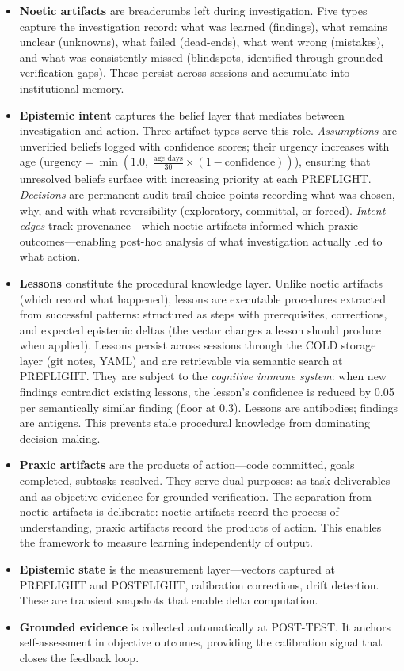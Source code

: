 \begin{itemize}
    \item \textbf{Noetic artifacts} are breadcrumbs left during investigation. Five types capture the investigation record: what was learned (findings), what remains unclear (unknowns), what failed (dead-ends), what went wrong (mistakes), and what was consistently missed (blindspots, identified through grounded verification gaps). These persist across sessions and accumulate into institutional memory.

    \item \textbf{Epistemic intent} captures the belief layer that mediates between investigation and action. Three artifact types serve this role. \emph{Assumptions} are unverified beliefs logged with confidence scores; their urgency increases with age ($\text{urgency} = \min(1.0,\; \frac{\text{age\_days}}{30} \times (1 - \text{confidence}))$), ensuring that unresolved beliefs surface with increasing priority at each PREFLIGHT. \emph{Decisions} are permanent audit-trail choice points recording what was chosen, why, and with what reversibility (exploratory, committal, or forced). \emph{Intent edges} track provenance---which noetic artifacts informed which praxic outcomes---enabling post-hoc analysis of what investigation actually led to what action.

    \item \textbf{Lessons} constitute the procedural knowledge layer. Unlike noetic artifacts (which record what happened), lessons are executable procedures extracted from successful patterns: structured as steps with prerequisites, corrections, and expected epistemic deltas (the vector changes a lesson should produce when applied). Lessons persist across sessions through the COLD storage layer (git notes, YAML) and are retrievable via semantic search at PREFLIGHT. They are subject to the \emph{cognitive immune system}: when new findings contradict existing lessons, the lesson's confidence is reduced by 0.05 per semantically similar finding (floor at 0.3). Lessons are antibodies; findings are antigens. This prevents stale procedural knowledge from dominating decision-making.

    \item \textbf{Praxic artifacts} are the products of action---code committed, goals completed, subtasks resolved. They serve dual purposes: as task deliverables and as objective evidence for grounded verification. The separation from noetic artifacts is deliberate: noetic artifacts record the process of understanding, praxic artifacts record the products of action. This enables the framework to measure learning independently of output.

    \item \textbf{Epistemic state} is the measurement layer---vectors captured at PREFLIGHT and POSTFLIGHT, calibration corrections, drift detection. These are transient snapshots that enable delta computation.

    \item \textbf{Grounded evidence} is collected automatically at POST-TEST. It anchors self-assessment in objective outcomes, providing the calibration signal that closes the feedback loop.
\end{itemize}

